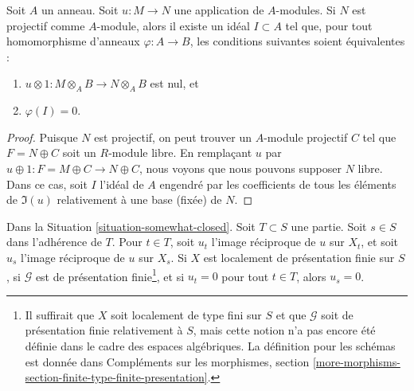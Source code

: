 \begin{lemma}
\label{lemma-F-zero-module-map}
Soit $A$ un anneau. Soit $u : M \to N$ une application de $A$-modules.
Si $N$ est projectif comme $A$-module, alors il existe un idéal
$I \subset A$ tel que, pour tout homomorphisme d'anneaux $\varphi : A \to B$,
les conditions suivantes soient équivalentes :
\begin{enumerate}
\item $u \otimes 1 : M \otimes_A B \to N \otimes_A B$ est nul, et
\item $\varphi(I) = 0$.
\end{enumerate}
\end{lemma}

\begin{proof}
Puisque $N$ est projectif, on peut trouver un $A$-module projectif $C$
tel que $F = N \oplus C$ soit un $R$-module libre.
En remplaçant $u$ par $u \oplus 1 : F = M \oplus C \to N \oplus C$,
nous voyons que nous pouvons supposer $N$ libre. Dans ce cas, soit $I$
l'idéal de $A$ engendré par les coefficients de tous les éléments de
$\Im(u)$ relativement à une base (fixée) de $N$.
\end{proof}

\begin{lemma}
\label{lemma-F-zero-somewhat-closed-points}
Dans la Situation \ref{situation-somewhat-closed}.
Soit $T \subset S$ une partie. Soit $s \in S$ dans l'adhérence de $T$.
Pour $t \in T$, soit $u_t$ l'image réciproque de $u$ sur $X_t$,
et soit $u_s$ l'image réciproque de $u$ sur $X_s$.
Si $X$ est localement de présentation finie sur $S$,
si $\mathcal{G}$ est de présentation finie\footnote{Il suffirait
que $X$ soit localement de type fini sur $S$
et que $\mathcal{G}$ soit de présentation finie relativement à $S$,
mais cette notion n'a pas encore été définie dans le cadre
des espaces algébriques. La définition pour les schémas est
donnée dans Compléments sur les morphismes, section
\ref{more-morphisms-section-finite-type-finite-presentation}.}, et si
$u_t = 0$ pour tout $t \in T$, alors $u_s = 0$.
\end{lemma}

